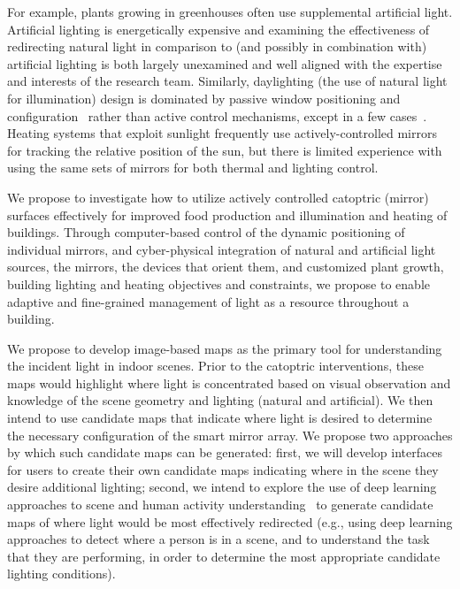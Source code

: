 For example, plants growing in greenhouses often use supplemental artificial
light. Artificial lighting is energetically expensive and examining the
effectiveness of redirecting natural light in comparison to
(and possibly in combination with)
artificial lighting is both largely unexamined and well aligned with the
expertise and interests of the research team.
Similarly, daylighting (the use of natural light for illumination) design is
dominated by passive window positioning and
configuration~\cite{azaise13,Leslie03,vgf+13}
rather than
active control mechanisms, except in a few cases~\cite{kt16}.
Heating systems that
exploit sunlight frequently use actively-controlled mirrors for tracking the
relative position of the sun, but there is limited experience with using the
same sets of mirrors for both thermal and lighting control.

We propose to investigate how to utilize actively controlled catoptric (mirror)
surfaces effectively for improved food production and illumination and heating
of buildings. Through computer-based control of the dynamic positioning of
individual mirrors, and cyber-physical integration of natural and artificial
light sources, the mirrors, the devices that orient them, and customized plant
growth, building lighting and heating objectives and constraints, we propose to
enable adaptive and fine-grained management of light as a resource throughout a
building.

We propose to develop image-based maps as the primary tool for understanding
the incident light in indoor scenes. Prior to the catoptric interventions,
these maps would highlight where light is concentrated based on visual
observation and knowledge of the scene geometry and lighting (natural and
artificial). We then intend to use candidate maps that indicate where light is
desired to determine the necessary configuration of the smart mirror array. We
propose two approaches by which such candidate maps can be generated: first, we
will develop interfaces for users to create their own candidate maps indicating
where in the scene they desire additional lighting; second, we intend to
explore the use of deep learning approaches to scene and human activity
understanding~\cite{chao:wacv2018,Gkioxari_2018_CVPR,Redmon2015YouOL,Toshev_2014_CVPR}
to generate candidate maps of where light would be most
effectively redirected (e.g., using deep learning approaches to detect where a
person is in a scene, and to understand the task that they are performing, in
order to determine the most appropriate candidate lighting conditions).


